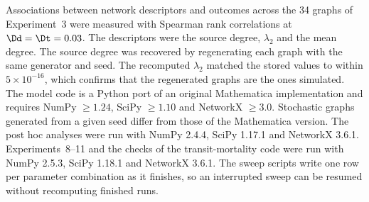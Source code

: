 Associations between network descriptors and outcomes across the 34 graphs of Experiment~3 were measured with Spearman rank correlations at $\Dd = \Dt = 0.03$. The descriptors were the source degree, $\lambda_2$ and the mean degree. The source degree was recovered by regenerating each graph with the same generator and seed. The recomputed $\lambda_2$ matched the stored values to within $5\times10^{-16}$, which confirms that the regenerated graphs are the ones simulated. The model code is a Python port of an original Mathematica implementation and requires NumPy $\ge 1.24$, SciPy $\ge 1.10$ and NetworkX $\ge 3.0$. Stochastic graphs generated from a given seed differ from those of the Mathematica version. The post hoc analyses were run with NumPy 2.4.4, SciPy 1.17.1 and NetworkX 3.6.1. Experiments~8--11 and the checks of the transit-mortality code were run with NumPy 2.5.3, SciPy 1.18.1 and NetworkX 3.6.1. The sweep scripts write one row per parameter combination as it finishes, so an interrupted sweep can be resumed without recomputing finished runs.
